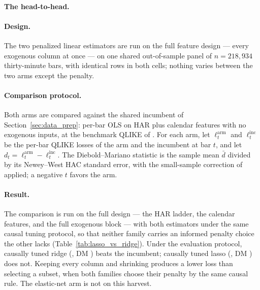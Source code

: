 \paragraph{The head-to-head.}\label{sec:dense_weak_headtohead}
\paragraph{Design.}
The two penalized linear estimators are run on the full feature design ---
every exogenous column at once --- on one shared out-of-sample panel of
$n = 218{,}934$ thirty-minute bars, with identical rows in both cells;
nothing varies between the two arms except the penalty.

\paragraph{Comparison protocol.}
Both arms are compared against the shared incumbent of
Section~\ref{sec:data_prep}: per-bar OLS on HAR plus calendar features with
no exogenous inputs, at the benchmark QLIKE of \unifAzeroQLIKE{}. For each
arm, let $\ell^{\mathrm{arm}}_t$ and
$\ell^{\mathrm{inc}}_t$ be the per-bar QLIKE losses \citep{Patton2011} of
the arm and the incumbent at bar $t$, and let
$d_t = \ell^{\mathrm{arm}}_t - \ell^{\mathrm{inc}}_t$. The Diebold--Mariano
statistic \citep{DieboldMariano1995} is the sample mean $\bar d$ divided by
its Newey--West HAC standard error, with the small-sample correction of
\citet{HarveyLeybourneNewbold1997} applied; a negative $t$ favors the arm.

\paragraph{Result.}
The comparison is run on the full design --- the HAR ladder, the calendar
features, and the full exogenous block --- with both estimators under the
same causal tuning protocol, so that neither family carries an informed
penalty choice the other lacks
(Table~\ref{tab:lasso_vs_ridge}). Under the evaluation protocol, causally
tuned ridge
(\unifBOneRidgeTunedFineQLIKE{}, DM \unifBOneRidgeTunedFineDM{})
beats the incumbent; causally tuned lasso
(\unifBTwoLassoTunedQLIKE{}, DM \unifBTwoLassoTunedDM{}) does not.
Keeping every column and shrinking produces a lower loss than selecting
a subset, when both families choose their penalty by the same causal
rule. The elastic-net arm is not on this harvest.

